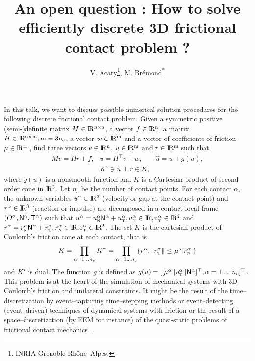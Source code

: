 \documentclass[10pt,a4paper]{article}
\title{An open question : How to solve efficiently discrete 3D frictional contact problem ?}
\author{V. Acary\thanks{INRIA Grenoble Rh\^one--Alpes.}, M. Br\'emond\textsuperscript{*}}
\date{}
\newcommand{\RR}{\ensuremath{\rm I\!R}}
\def\n{{\hbox{\tiny{N}}}}
\def\t{{\hbox{\tiny{T}}}}
\begin{document}
\maketitle
In this talk, we want to discuss possible numerical solution procedures for the following discrete frictional contact problem\cite{Acary.Brogliato2008}.  Given a symmetric positive (semi-)definite matrix ${M} \in \RR^{n \times n}$, a vector $ {f} \in \RR^n$, a matrix  ${H} \in \RR^{n \times m}, m= 3n_c$, a vector $w \in \RR^{m}$ and a vector of coefficients of friction $\mu \in \RR^{n_c}$, find three vectors $ {v} \in \RR^n$, $u\in\RR^m$ and $r\in \RR^m$ such that
\begin{equation}\label{eq:soccp1}
  \begin{array}{rcl}
    M v = {H} {r} + {f}, &
    u = H^\top v + w,  &
    \hat u = u + g(u) ,\\[1mm]
    &    K^\star \ni {\hat u} \perp r \in K,&
  \end{array}
\end{equation}
where $g(u)$ is a nonsmooth function and $K$ is a Cartesian product of second order cone in $\RR^3$.  Let $n_c$ be the number of contact points.  For each contact $\alpha$, the unknown variables  $u^\alpha\in\RR^3$ (velocity or gap at the contact point) and $r^\alpha\in\RR^3$ (reaction or impulse) are decomposed  in a contact local frame $(O^\alpha,{\sf N}^\alpha,{\sf T}^\alpha)$ such that $u^\alpha = u^\alpha_{\n} {\sf N}^\alpha +   u^{\alpha}_{\t}, u^\alpha_{\n} \in \RR, u^\alpha_{\t} \in \RR^2$ and  $r^\alpha = r^\alpha_{\n} {\sf N}^\alpha +   r^{\alpha}_{\t}, r^\alpha_{\n} \in \RR, r^\alpha_{\t} \in \RR^2$.
The set $K$ is the cartesian product of Coulomb's friction cone at each contact, that is
\begin{equation}
  \label{eq:CC}
  K = \prod_{\alpha=1\ldots n_c} K^{\alpha}  = \prod_{\alpha=1\ldots n_c} \{r^\alpha, \|r^\alpha_\t \| \leq \mu^\alpha |r^\alpha_\n| \}
\end{equation}
and $K^\star$ is dual.
The function $g$ is defined as $g(u) = [[\mu^\alpha  \|u^\alpha_\t\| {\sf N}^\alpha]^\top, \alpha = 1\ldots n_c]^\top$.  This problem is at the heart of the simulation of mechanical systems with 3D Coulomb's friction and unilateral constraints. It might be the result of the time--discretization by event--capturing time--stepping methods or event--detecting (event--driven) techniques of dynamical systems with friction or the result of a space--discretization (by FEM for instance) of the quasi-static problems of frictional contact mechanics~\cite{Acary.Cadoux2013}.
\end{document}
